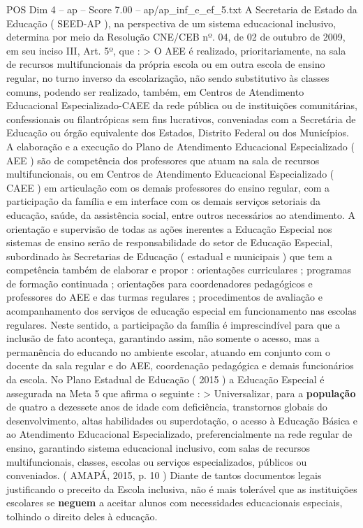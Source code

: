 \begin{textsample}{POS Dim 4 – ap – Score 7.00 – ap/ap\_inf\_e\_ef\_5.txt}
A Secretaria de Estado da Educação ( SEED-AP ), na perspectiva de um sistema educacional inclusivo, determina por meio da Resolução CNE/CEB nº. 04, de 02 de outubro de 2009, em seu inciso III, Art. 5º, que : > O AEE é realizado, prioritariamente, na sala de recursos multifuncionais da própria escola ou em outra escola de ensino regular, no turno inverso da escolarização, não sendo substitutivo às classes comuns, podendo ser realizado, também, em Centros de Atendimento Educacional Especializado-CAEE da rede pública ou de instituições comunitárias, confessionais ou filantrópicas sem fins lucrativos, conveniadas com a Secretária de Educação ou órgão equivalente dos Estados, Distrito Federal ou dos Municípios.
A elaboração e a execução do Plano de Atendimento Educacional Especializado ( AEE ) são de competência dos professores que atuam na sala de recursos multifuncionais, ou em Centros de Atendimento Educacional Especializado ( CAEE ) em articulação com os demais professores do ensino regular, com a participação da família e em interface com os demais serviços setoriais da educação, saúde, da assistência social, entre outros necessários ao atendimento.
A orientação e supervisão de todas as ações inerentes a Educação Especial nos sistemas de ensino serão de responsabilidade do setor de Educação Especial, subordinado às Secretarias de Educação ( estadual e municipais ) que tem a competência também de elaborar e propor : orientações curriculares ; programas de formação continuada ; orientações para coordenadores pedagógicos e professores do AEE e das turmas regulares ; procedimentos de avaliação e acompanhamento dos serviços de educação especial em funcionamento nas escolas regulares.
Neste sentido, a participação da família é imprescindível para que a inclusão de fato aconteça, garantindo assim, não somente o acesso, mas a permanência do educando no ambiente escolar, atuando em conjunto com o docente da sala regular e do AEE, coordenação pedagógica e demais funcionários da escola.
No Plano Estadual de Educação ( 2015 ) a Educação Especial é assegurada na Meta 5 que afirma o seguinte : > Universalizar, para a \textbf{população} de quatro a dezessete anos de idade com deficiência, transtornos globais do desenvolvimento, altas habilidades ou superdotação, o acesso à Educação Básica e ao Atendimento Educacional Especializado, preferencialmente na rede regular de ensino, garantindo sistema educacional inclusivo, com salas de recursos multifuncionais, classes, escolas ou serviços especializados, públicos ou conveniados. ( AMAPÁ, 2015, p. 10 ) Diante de tantos documentos legais justificando o preceito da Escola inclusiva, não é mais tolerável que as instituições escolares se \textbf{neguem} a aceitar alunos com necessidades educacionais especiais, tolhindo o direito deles à educação.

\end{textsample}
